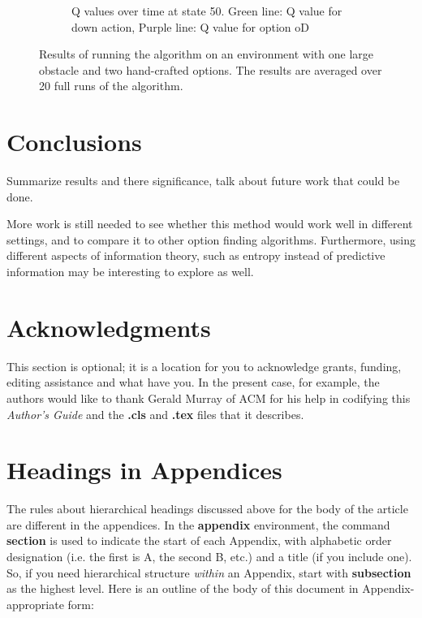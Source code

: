 \documentclass{acm_proc_article-sp}
\begin{document}
\begin{figure}[!htbp]
\begin{subfigure}[h]{.45\textwidth}
    \caption{Q values over time at state 50. Green line: Q value for down action, Purple line: Q value for option oD}
  \end{subfigure}
  \caption{Results of running the algorithm on an environment with one large obstacle and two hand-crafted options. The results are averaged over 20 full runs of the algorithm.}
  \vspace{20pt}
\end{figure}

\section{Conclusions}

Summarize results and there significance, talk about future work that could be done.

More work is still needed to see whether this method would work well in different settings, and to compare it to other option finding algorithms. Furthermore, using different aspects of information theory, such as entropy instead of predictive information may be interesting to explore as well.

\section{Acknowledgments}
This section is optional; it is a location for you
to acknowledge grants, funding, editing assistance and
what have you.  In the present case, for example, the
authors would like to thank Gerald Murray of ACM for
his help in codifying this \textit{Author's Guide}
and the \textbf{.cls} and \textbf{.tex} files that it describes.

%

%
%
\appendix
\section{Headings in Appendices}
The rules about hierarchical headings discussed above for
the body of the article are different in the appendices.
In the \textbf{appendix} environment, the command
\textbf{section} is used to
indicate the start of each Appendix, with alphabetic order
designation (i.e. the first is A, the second B, etc.) and
a title (if you include one).  So, if you need
hierarchical structure
\textit{within} an Appendix, start with \textbf{subsection} as the
highest level. Here is an outline of the body of this
document in Appendix-appropriate form:
\end{document}
